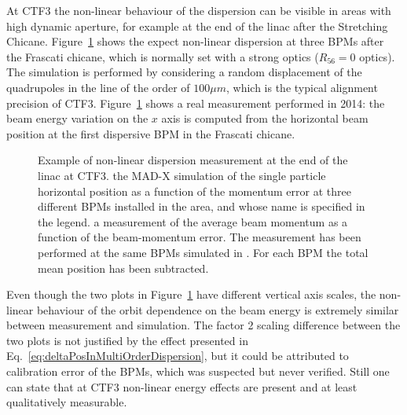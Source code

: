 At CTF3 the non-linear behaviour of the dispersion can be visible in areas with high
dynamic aperture, for example at the end of the linac after the Stretching Chicane.
Figure~\ref{fig:nonLinearitiesAfterFrascati}
shows the expect non-linear dispersion at three BPMs after the Frascati chicane, which is
normally set with a strong optics ($R_{56} = 0$ optics).
The simulation is performed by considering a random displacement of the quadrupoles in the
line of the order of $100 \mu m$, which is the typical alignment precision of CTF3. 
Figure~\ref{fig:nonLinearitiesAfterFrascati}
 shows a real measurement performed in
2014: the beam energy variation on the $x$ axis is computed from the horizontal beam
position at the first dispersive BPM in the Frascati chicane.
%
\begin{figure}[h]
\centering
{}
\qquad
{}
\caption{Example of non-linear dispersion measurement at the end of the linac at CTF3.
         \protect{} the MAD-X simulation of the single
         particle horizontal position as a function of the momentum error at three different BPMs
         installed in the area,
         and whose name is specified in the legend.
         \protect{} a measurement of the average beam
         momentum as a function of the beam-momentum error.
         The measurement has been performed at the same BPMs simulated in
         \protect{}.
         For each BPM the total mean position has been subtracted.
}
\label{fig:nonLinearitiesAfterFrascati}
\end{figure}
%
Even though the two plots in Figure~\ref{fig:nonLinearitiesAfterFrascati} have different vertical axis scales,
the non-linear behaviour of the orbit dependence on the beam energy is extremely similar between measurement and simulation.
The factor 2 scaling difference between the two plots is not justified by the effect presented in Eq.~\ref{eq:deltaPosInMultiOrderDispersion},
but it could be attributed to calibration error of the BPMs, which was suspected but never verified. 
Still one can state that at CTF3 non-linear energy effects are present and at least qualitatively measurable.


